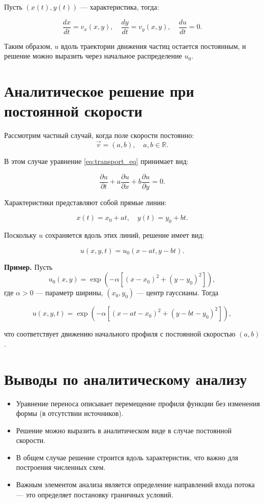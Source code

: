 Пусть $(x(t), y(t))$ — характеристика, тогда:

\begin{equation}
	\frac{dx}{dt} = v_x(x, y), \quad \frac{dy}{dt} = v_y(x, y), \quad \frac{du}{dt} = 0.
	\label{eq:characteristics}
\end{equation}

Таким образом, $u$ вдоль траектории движения частиц остается постоянным, и решение можно выразить через начальное распределение $u_0$.

\section{Аналитическое решение при постоянной скорости}

Рассмотрим частный случай, когда поле скорости постоянно:
\[
\vec{v} = (a, b), \quad a, b \in \mathbb{R}.
\]

В этом случае уравнение \eqref{eq:transport_eq} принимает вид:

\begin{equation}
	\frac{\partial u}{\partial t} + a \frac{\partial u}{\partial x} + b \frac{\partial u}{\partial y} = 0.
	\label{eq:const_velocity}
\end{equation}

Характеристики представляют собой прямые линии:

\[
x(t) = x_0 + at, \quad y(t) = y_0 + bt.
\]

Поскольку $u$ сохраняется вдоль этих линий, решение имеет вид:

\begin{equation}
	u(x, y, t) = u_0(x - at, y - bt).
	\label{eq:analytical_solution}
\end{equation}

\textbf{Пример.} Пусть
\[
u_0(x, y) = \exp\left(-\alpha[(x - x_0)^2 + (y - y_0)^2]\right),
\]
где $\alpha > 0$ — параметр ширины, $(x_0, y_0)$ — центр гауссианы. Тогда

\begin{equation}
	u(x, y, t) = \exp\left(-\alpha[(x - at - x_0)^2 + (y - bt - y_0)^2]\right),
\end{equation}

что соответствует движению начального профиля с постоянной скоростью $(a, b)$.

\section{Выводы по аналитическому анализу}

\begin{itemize}
	\item Уравнение переноса описывает перемещение профиля функции без изменения формы (в отсутствии источников).
	\item Решение можно выразить в аналитическом виде в случае постоянной скорости.
	\item В общем случае решение строится вдоль характеристик, что важно для построения численных схем.
	\item Важным элементом анализа является определение направлений входа потока — это определяет постановку граничных условий.
\end{itemize}
